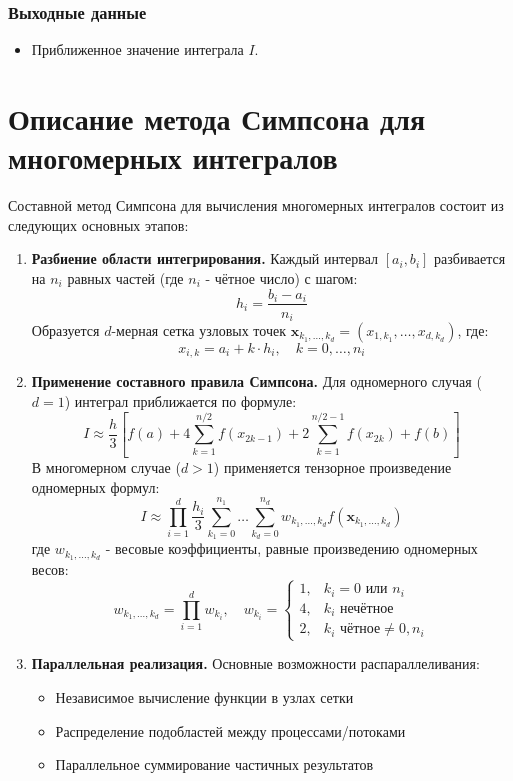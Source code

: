 \documentclass[12pt]{article}
\begin{document}
\subsubsection{Выходные данные}
\begin{itemize}
    \item Приближенное значение интеграла $I$.
\end{itemize}



\newpage
\section{Описание метода Симпсона для многомерных интегралов}
Составной метод Симпсона для вычисления многомерных интегралов состоит из следующих основных этапов:

\begin{enumerate}
    \item \textbf{Разбиение области интегрирования.} 
    Каждый интервал $[a_i, b_i]$ разбивается на $n_i$ равных частей (где $n_i$ - чётное число) с шагом:
    \[ h_i = \frac{b_i - a_i}{n_i} \]
    Образуется $d$-мерная сетка узловых точек $\mathbf{x}_{k_1,\dots,k_d} = (x_{1,k_1}, \dots, x_{d,k_d})$, где:
    \[ x_{i,k} = a_i + k \cdot h_i, \quad k = 0,\dots,n_i \]
    
    \item \textbf{Применение составного правила Симпсона.} 
    Для одномерного случая ($d=1$) интеграл приближается по формуле:
    \[
    I \approx \frac{h}{3} \left[ f(a) + 4\sum_{k=1}^{n/2} f(x_{2k-1}) + 2\sum_{k=1}^{n/2-1} f(x_{2k}) + f(b) \right]
    \]
    В многомерном случае ($d>1$) применяется тензорное произведение одномерных формул:
    \[
    I \approx \prod_{i=1}^d \frac{h_i}{3} \sum_{k_1=0}^{n_1} \dots \sum_{k_d=0}^{n_d} w_{k_1,\dots,k_d} f(\mathbf{x}_{k_1,\dots,k_d})
    \]
    где $w_{k_1,\dots,k_d}$ - весовые коэффициенты, равные произведению одномерных весов:
    \[
    w_{k_1,\dots,k_d} = \prod_{i=1}^d w_{k_i}, \quad w_{k_i} = 
    \begin{cases}
    1, & k_i = 0 \text{ или } n_i \\
    4, & k_i \text{ нечётное} \\
    2, & k_i \text{ чётное} \neq 0, n_i
    \end{cases}
    \]
    
    \item \textbf{Параллельная реализация.} 
    Основные возможности распараллеливания:
    \begin{itemize}
        \item Независимое вычисление функции в узлах сетки
        \item Распределение подобластей между процессами/потоками
        \item Параллельное суммирование частичных результатов
    \end{itemize}
\end{enumerate}
\end{document}
